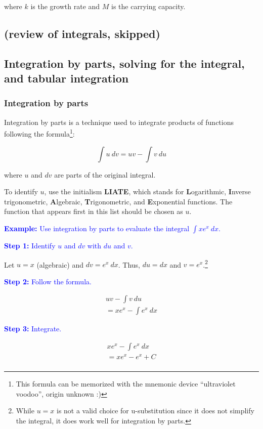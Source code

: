 \documentclass[letterpaper, 12pt]{article}
\newcommand{\example}[1]{\textcolor{blue}{\textbf{Example:} #1}}
\newcommand{\step}[2]{\textcolor{blue}{\textbf{Step #1:} #2}}
\begin{document}
where $k$ is the growth rate and $M$ is the carrying capacity.

\subsection*{(review of integrals, skipped)}

\subsection*{Integration by parts, solving for the integral, and tabular integration}

\subsubsection*{Integration by parts}

Integration by parts is a technique used to integrate products of functions following the formula\footnote{This formula can be memorized with the mnemonic device ``ultraviolet voodoo'', origin unknown :)}:

$$\int u \: dv = uv - \int v \: du$$

where $u$ and $dv$ are parts of the original integral.

To identify $u$, use the initialism \textbf{LIATE}, which stands for \textbf{L}ogarithmic, \textbf{I}nverse trigonometric, \textbf{A}lgebraic, \textbf{T}rigonometric, and \textbf{E}xponential functions. The function that appears first in this list should be chosen as $u$.

\example{Use integration by parts to evaluate the integral $\displaystyle \int x e^x \: dx$.}

\step{1}{Identify $u$ and $dv$ with $du$ and $v$.}

Let $u = x$ (algebraic) and $dv = e^x \: dx$. Thus, $du = dx$ and $v = e^x$.\footnote{While $u=x$ is not a valid choice for u-substitution since it does not simplify the integral, it does work well for integration by parts.}

\step{2}{Follow the formula.}

\begin{gather*}
uv - \int v \: du \\
= x e^x - \int e^x \: dx
\end{gather*}

\step{3}{Integrate.}

\begin{gather*}
x e^x - \int e^x \: dx \\ 
= \boxed{x e^x - e^x + C} \\
\end{gather*}
\end{document}
